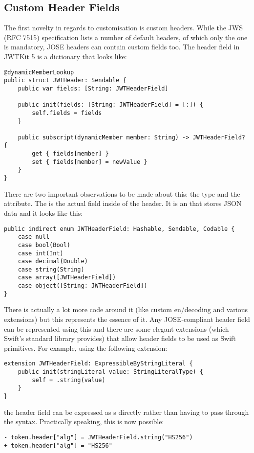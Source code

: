 \subsection{Custom Header Fields}
The first novelty in regards to customisation is custom headers. While the JWS (RFC 7515) specification lists a number of default headers, of which only the  one is mandatory, JOSE headers can contain custom fields too. The header field in JWTKit 5 is a dictionary that looks like:
\begin{verbatim}
@dynamicMemberLookup
public struct JWTHeader: Sendable {
    public var fields: [String: JWTHeaderField]

    public init(fields: [String: JWTHeaderField] = [:]) {
        self.fields = fields
    }

    public subscript(dynamicMember member: String) -> JWTHeaderField? {
        get { fields[member] }
        set { fields[member] = newValue }
    }
}
\end{verbatim}
There are two important observations to be made about this: the  type and the  attribute.
The  is the actual field inside of the header. It is an  that stores JSON data and it looks like this:
\begin{verbatim}
public indirect enum JWTHeaderField: Hashable, Sendable, Codable {
    case null
    case bool(Bool)
    case int(Int)
    case decimal(Double)
    case string(String)
    case array([JWTHeaderField])
    case object([String: JWTHeaderField])
}
\end{verbatim}
There is actually a lot more code around it (like custom en/decoding and various extensions) but this represents the essence of it.
Any JOSE-compliant header field can be represented using this  and there are some elegant extensions (which Swift's standard library provides) that allow header fields to be used as Swift primitives. For example, using the following extension:
\begin{verbatim}
extension JWTHeaderField: ExpressibleByStringLiteral {
    public init(stringLiteral value: StringLiteralType) {
        self = .string(value)
    }
}
\end{verbatim}
the header field can be expressed as s directly rather than having to pass through the  syntax. Practically speaking, this is now possible:
\begin{verbatim}
- token.header["alg"] = JWTHeaderField.string("HS256")
+ token.header["alg"] = "HS256"
\end{verbatim}
